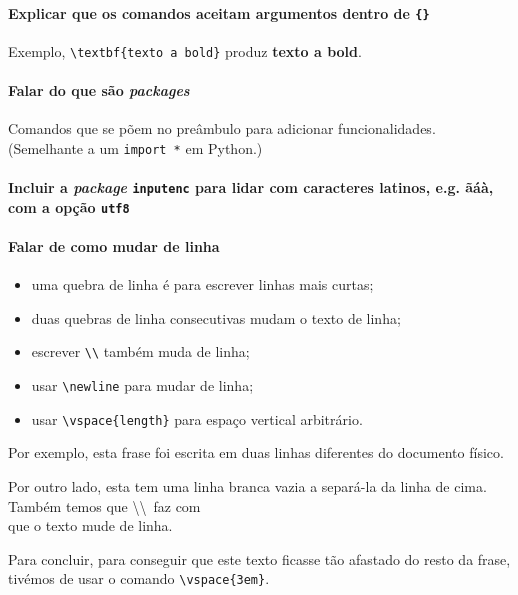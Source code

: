 \documentclass[11pt]{article}
\begin{document}
\paragraph{Explicar que os comandos aceitam argumentos dentro de \texttt{\{\}}}
Exemplo, \verb|\textbf{texto a bold}| produz \textbf{texto a bold}.

\paragraph{Falar do que são \textit{packages}}
Comandos que se põem no preâmbulo para adicionar funcionalidades. (Semelhante a
um \texttt{import *} em Python.)

\paragraph{Incluir a \textit{package} \texttt{inputenc} para lidar
com caracteres latinos, e.g. ãáà, com a opção \texttt{utf8}}

\paragraph{Falar de como mudar de linha}
\begin{itemize}
    \item uma quebra de linha é para escrever linhas mais curtas;
    \item duas quebras de linha consecutivas mudam o texto de linha;
    \item escrever \verb|\\| também muda de linha;
    \item usar \verb|\newline| para mudar de linha;
    \item usar \verb|\vspace{length}| para espaço vertical arbitrário.
\end{itemize}

Por exemplo, esta frase foi escrita
em duas linhas diferentes do documento físico.

Por outro lado, esta tem uma linha branca vazia a separá-la da linha de cima.
Também temos que \textbackslash\textbackslash~faz com \\ que o texto mude de linha.

Para concluir, para conseguir que este texto ficasse tão afastado
\vspace{3em}
do resto da frase, tivémos de usar o comando \verb|\vspace{3em}|.
\end{document}
